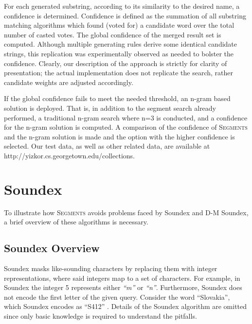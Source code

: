 \documentclass{endm}
\begin{document}
\begin{CJK}{UTF8}{song}
For each generated substring, according to its similarity to the desired name, a confidence is determined.  Confidence is defined as the summation of all substring matching algorithms which found (voted for) a candidate word over the total number of casted votes.  The global confidence of the merged result set is computed.  Although multiple generating rules derive some identical candidate strings, this replication was experimentally observed as needed to bolster the confidence.  Clearly, our description of the approach is strictly for clarity of presentation; the actual implementation does not replicate the search, rather candidate weights are adjusted accordingly.  

If the global confidence fails to meet the needed threshold, an n-gram based solution is deployed.  That is, in addition to the segment search already performed, a traditional n-gram search where n=3 is conducted, and a confidence for the n-gram solution is computed.  A comparison of the confidence of S\textsc{egments} and the n-gram solution is made and the option with the higher confidence is selected. Our test data, as well as other related data, are available at http://yizkor.cs.georgetown.edu/collections.


\section{Soundex} %
\label{sec:soundex}

To illustrate how S\textsc{egments} avoids problems faced by Soundex and D-M Soundex, a brief overview of these algorithms  is necessary. 


\subsection{Soundex Overview} %
\label{sub:soundex_overview}

Soundex masks like-sounding characters by replacing them with integer representations, where said integers map to a set of characters.  For example, in Soundex the integer 5 represents either \emph{``m''} or \emph{``n''}.  
Furthermore, Soundex does not encode the first letter of the given query.  Consider the word ``Slovakia'', which Soundex encodes as ``S412'' \cite{mokotoff:soundexing}.  Details of the Soundex algorithm are omitted since only basic knowledge is required to understand the pitfalls.


\end{CJK}
\end{document}

